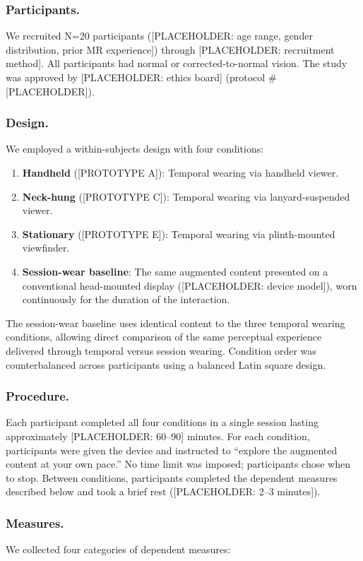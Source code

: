 \subsubsection{Participants.}
We recruited N=20 participants ([PLACEHOLDER: age range, gender distribution, prior MR experience]) through [PLACEHOLDER: recruitment method]. All participants had normal or corrected-to-normal vision. The study was approved by [PLACEHOLDER: ethics board] (protocol \#[PLACEHOLDER]).

\subsubsection{Design.}
We employed a within-subjects design with four conditions:

\begin{enumerate}
    \item \textbf{Handheld} ([PROTOTYPE A]): Temporal wearing via handheld viewer.
    \item \textbf{Neck-hung} ([PROTOTYPE C]): Temporal wearing via lanyard-suspended viewer.
    \item \textbf{Stationary} ([PROTOTYPE E]): Temporal wearing via plinth-mounted viewfinder.
    \item \textbf{Session-wear baseline}: The same augmented content presented on a conventional head-mounted display ([PLACEHOLDER: device model]), worn continuously for the duration of the interaction.
\end{enumerate}

The session-wear baseline uses identical content to the three temporal wearing conditions, allowing direct comparison of the same perceptual experience delivered through temporal versus session wearing. Condition order was counterbalanced across participants using a balanced Latin square design.

\subsubsection{Procedure.}
Each participant completed all four conditions in a single session lasting approximately [PLACEHOLDER: 60--90] minutes. For each condition, participants were given the device and instructed to ``explore the augmented content at your own pace.'' No time limit was imposed; participants chose when to stop. Between conditions, participants completed the dependent measures described below and took a brief rest ([PLACEHOLDER: 2--3 minutes]).

\subsubsection{Measures.}
We collected four categories of dependent measures:

